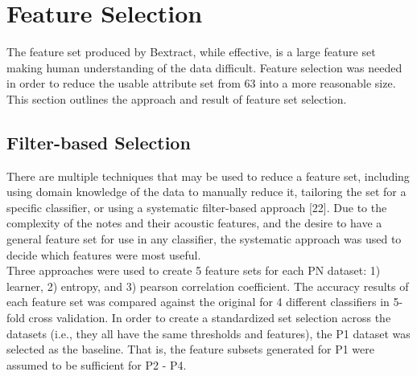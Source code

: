 \documentclass{article}
\begin{document}
\section{Feature Selection}
The feature set produced by Bextract, while effective, is a large feature set making human understanding of the data difficult. Feature selection was needed in order to reduce the usable attribute set from 63 into a more reasonable size. This section outlines the approach and result of feature set selection.
\subsection{Filter-based Selection}
There are multiple techniques that may be used to reduce a feature set, including using domain knowledge of the data to manually reduce it, tailoring the set for a specific classifier, or using a systematic filter-based approach [22]. Due to the complexity of the notes and their acoustic features, and the desire to have a general feature set for use in any classifier, the systematic approach was used to decide which features were most useful.\\
Three approaches were used to create 5 feature sets for each PN dataset: 1) learner, 2) entropy, and 3) pearson correlation coefficient. The accuracy results of each feature set was compared against the original for 4 different classifiers in 5-fold cross validation. In order to create a standardized set selection across the datasets (i.e., they all have the same thresholds and features), the P1 dataset was selected as the baseline. That is, the feature subsets generated for P1 were assumed to be sufficient for P2 - P4.
\end{document}
